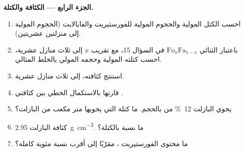 \begin{problem}
\medskip
\noindent\textbf{الجزء الرابع --- الكثافة والكتلة.}
\begin{enumerate}[resume]
  \item احسب الكتل المولية والحجوم المولية للفورستيريت والفايالايت (الحجوم المولية إلى منزلتين عشريتين).
  \item باعتبار  الثنائي $\mathrm{Fo}_x\mathrm{Fa}_{1-x}$ في السؤال 15، مع تقريب $x$ إلى ثلاث منازل عشرية، احسب كتلته المولية وحجمه المولي بالخلط المثالي.
  \item استنتج كثافته، إلى ثلاث منازل عشرية.
  \item قارنها بالاستكمال الخطي بين كثافتي .
  \item يحوي البازلت \qty{12}{\percent} من  بالحجم. ما كتلة  التي يحويها متر مكعب من البازلت؟
  \item كثافة البازلت \qty{2.95}{g.cm^{-3}}. ما نسبة  بالكتلة؟
  \item ما محتوى الفورستيريت ، مقرّبًا إلى أقرب نسبة مئوية كاملة؟
\end{enumerate}
\end{problem}
